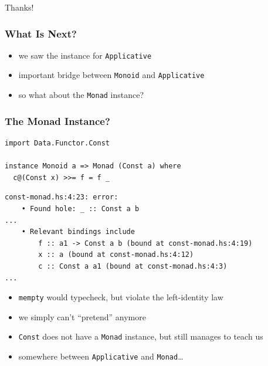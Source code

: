 \documentclass[aspectratio=169]{beamer}
\begin{document}
\begin{frame}
  \begin{center}
    \Huge{}
    Thanks!
  \end{center}
\end{frame}

\appendix{}

\begin{frame}[fragile]
  \frametitle{What Is Next?}
  \begin{itemize}
  \item we saw the instance for \texttt{Applicative}
  \item important bridge between \texttt{Monoid} and \texttt{Applicative}
  \item so what about the \texttt{Monad} instance?
  \end{itemize}
\end{frame}

\begin{frame}[fragile]
  \frametitle{The Monad Instance?}
  \begin{verbatim}
import Data.Functor.Const

instance Monoid a => Monad (Const a) where
  c@(Const x) >>= f = f _
  \end{verbatim}
  \begin{verbatim}
const-monad.hs:4:23: error:
    • Found hole: _ :: Const a b
...
    • Relevant bindings include
        f :: a1 -> Const a b (bound at const-monad.hs:4:19)
        x :: a (bound at const-monad.hs:4:12)
        c :: Const a a1 (bound at const-monad.hs:4:3)
...
  \end{verbatim}
\end{frame}

\begin{frame}[fragile]
  \begin{itemize}
  \item \texttt{mempty} would typecheck, but violate the left-identity law
  \item we simply can't ``pretend'' anymore
  \item \texttt{Const} does not have a \texttt{Monad} instance, but
    still manages to teach us
  \item somewhere between \texttt{Applicative} and
    \texttt{Monad}\ldots
  \end{itemize}
\end{frame}
\end{document}
